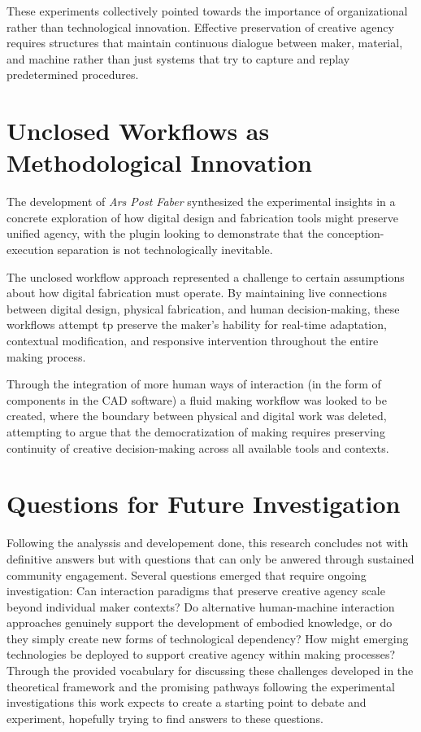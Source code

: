 \vspace{0.5cm}

These experiments collectively pointed towards the importance of organizational rather than technological innovation. Effective preservation of creative agency requires structures that maintain continuous dialogue between maker, material, and machine rather than just systems that try to capture and replay predetermined procedures.

\section{Unclosed Workflows as Methodological Innovation}

The development of \textit{Ars Post Faber} synthesized the experimental insights in a concrete exploration of how digital design and fabrication tools might preserve unified agency, with the plugin looking to demonstrate that the conception-execution separation is not technologically inevitable.

\vspace{0.5cm}

The unclosed workflow approach represented a challenge to certain assumptions about how digital fabrication must operate. By maintaining live connections between digital design, physical fabrication, and human decision-making, these workflows attempt tp preserve the maker's hability for real-time adaptation, contextual modification, and responsive intervention throughout the entire making process.

\vspace{0.5cm}

Through the integration of more human ways of interaction (in the form of components in the CAD software) a fluid making workflow was looked to be created, where the boundary between physical and digital work was deleted, attempting to argue that the democratization of making requires preserving continuity of creative decision-making across all available tools and contexts.

\section{Questions for Future Investigation}

Following the analyssis and developement done, this research concludes not with definitive answers but with questions that can only be anwered through sustained community engagement. Several questions emerged that require ongoing investigation: Can interaction paradigms that preserve creative agency scale beyond individual maker contexts? Do alternative human-machine interaction approaches genuinely support the development of embodied knowledge, or do they simply create new forms of technological dependency? How might emerging technologies be deployed to support creative agency within making processes? Through the provided vocabulary for discussing these challenges developed in the theoretical framework and the promising pathways following the experimental investigations this work expects to create a starting point to debate and experiment, hopefully trying to find answers to these questions.

